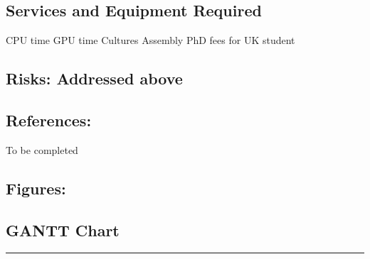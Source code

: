 \documentclass{article}
\begin{document}
\subsection*{Services and Equipment Required}
CPU time
GPU time
Cultures
Assembly
PhD fees for UK student

\subsection*{Risks:  Addressed above}

\subsection*{References:}
To be completed

\subsection*{Figures:} 

\subsection*{GANTT Chart}
\noindent\rule{\linewidth}{0.4pt}
\end{document}
